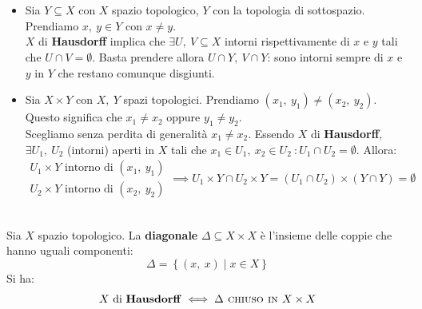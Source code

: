 \begin{proposition}~{}\label{prodottihause}
\end{proposition}
\begin{demonstration}~{}
\begin{itemize}
\item Sia $Y\subseteq X$ con $X$ spazio topologico, $Y$ con la topologia di sottospazio. Prendiamo $x,\ y\in Y$ con $x\neq y$.\\
$X$ di \textbf{Hausdorff} implica che $\exists U,\ V\subseteq X$ intorni rispettivamente di $x$ e $y$ tali che $U\cap V=\emptyset$. Basta prendere allora $U\cap Y,\ V\cap Y$: sono intorni sempre di $x$ e $y$ in $Y$ che restano comunque disgiunti.
\item Sia $X\times Y$ con $X,\ Y$ spazi topologici. Prendiamo $\left(x_1,\ y_1\right)\neq\left(x_2,\ y_2\right)$. Questo significa che $x_1\neq x_2$ oppure $y_1\neq y_2$.\\
Scegliamo senza perdita di generalità $x_1\neq x_2$. Essendo $X$ di \textbf{Hausdorff}, $\exists U_1,\ U_2$ (intorni) aperti in $X$  tali che $x_1\in U_1,\ x_2\in U_2\ \colon U_1\cap U_2=\emptyset$. Allora:
\begin{equation*}
\begin{array}{l}
	U_1\times Y\text{ intorno di }\left(x_1,\ y_1\right)\\
	U_2\times Y\text{ intorno di }\left(x_2,\ y_2\right)
\end{array}
\implies U_1\times Y\cap U_2\times Y=\left(U_1\cap U_2\right)\times\left(Y\cap Y\right)=\emptyset 
\end{equation*}
\end{itemize}
\vspace{-6mm}
\end{demonstration}
\begin{theorema}~{}\label{hausdorff diagonale chiusa}\\
Sia $X$ spazio topologico. La \textbf{diagonale} $\Delta\subseteq X\times X$ è l'insieme delle coppie che hanno uguali componenti:
\begin{equation}
	\Delta=\left\{\left(x,\ x\right)\mid x\in X\right\}
\end{equation}
Si ha:
\begin{equation}
X \text{ di \textbf{Hausdorff}} \iff \Delta \textsc{ chiuso in }X\times X
\end{equation}
\vspace{-6mm}
\end{theorema}
